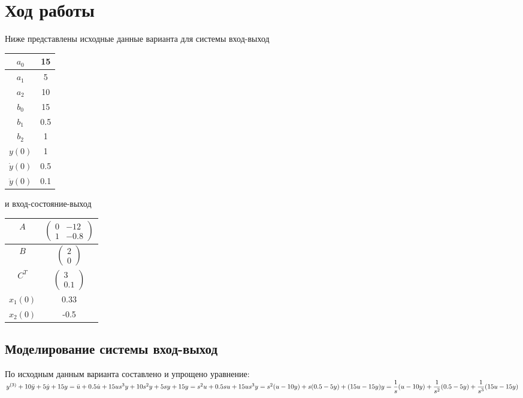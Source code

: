 \documentclass[a4paper,12pt,russian]{article} %
\begin{document}
		\section{Ход работы}
Ниже представлены исходные данные варианта для системы вход-выход\\
\begin{center}
\begin{tabular}{|c|c|}
	\hline
	$a_0$ & 15 \\ \hline
	$a_1$ & 5 \\ \hline
	$a_2$ & 10 \\ \hline
	$b_0$ & 15 \\ \hline
	$b_1$ & 0.5 \\ \hline
	$b_2$ & 1 \\ \hline
	$y(0)$ & 1 \\ \hline
	$\dot{y}(0)$ & 0.5 \\ \hline
	$\ddot{y}(0)$ & 0.1\\ \hline
\end{tabular}
\end{center}
и вход-состояние-выход\\
\begin{center}
	\begin{tabular}{|c|c|}
		\hline
		$A$ & $\begin{pmatrix}0& -12\\1& -0.8\end{pmatrix}$ \\ \hline
		$B$ & $\begin{pmatrix}2\\0\end{pmatrix}$ \\ \hline
		$C^T$ & $\begin{pmatrix}3\\0.1\end{pmatrix}$ \\ \hline
		$x_1(0)$ & 0.33 \\ \hline
		$x_2(0)$ & -0.5 \\ \hline
	\end{tabular}
\end{center}

\subsection{Моделирование системы вход-выход}
По исходным данным варианта составлено и упрощено уравнение:\\
$y^{(3)}+10\ddot{y}+5\dot{y}+15y=\ddot{u}+0.5\dot{u}+15u\\
s^3y+10s^2y+5sy+15y=s^2u+0.5su+15u\\
s^3y=s^2(u-10y)+s(0.5-5y)+(15u-15y)\\
y=\dfrac{1}{s}(u-10y)+\dfrac{1}{s^2}(0.5-5y)+\dfrac{1}{s^3}(15u-15y)\\$
\end{document}
